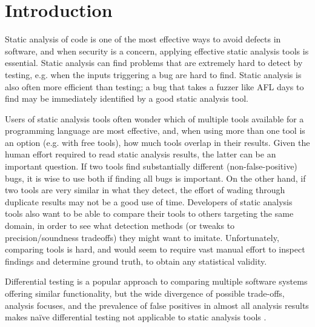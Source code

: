 \section{Introduction}

Static analysis of code is one of the most effective ways to avoid defects in software, and when security is a concern, applying effective static analysis tools is essential.  Static analysis can find problems that are extremely hard to detect by testing, e.g. when the inputs triggering a bug are hard to find.  Static analysis is also often more efficient than testing; a bug that takes a fuzzer like AFL days to find may be immediately identified by a good static analysis tool.

Users of static analysis tools often wonder which of multiple tools available for a programming language are most effective, and, when using more than one tool is an option (e.g. with free tools), how much tools overlap in their results.  Given the human effort required to read static analysis results, the latter can be an important question.  If two tools find substantially different (non-false-positive) bugs, it is wise to use both if finding all bugs is important.  On the other hand, if two tools are very similar in what they detect, the effort of wading through duplicate results may not be a good use of time.  Developers of static analysis tools also want to be able to compare their tools to others targeting the same domain, in order to see what detection methods (or tweaks to precision/soundness tradeoffs) they might want to imitate.  Unfortunately, comparing tools is hard, and would seem to require vast manual effort to inspect findings and determine ground truth, to obtain any statistical validity.

Differential testing \cite{Differential,ICSEDiff} is a popular approach to comparing multiple software systems offering similar functionality, but the wide divergence of possible trade-offs, analysis focuses, and the prevalence of false positives in almost all analysis results makes na\"ive differential testing not applicable to static analysis tools \cite{regehrRandom}.

